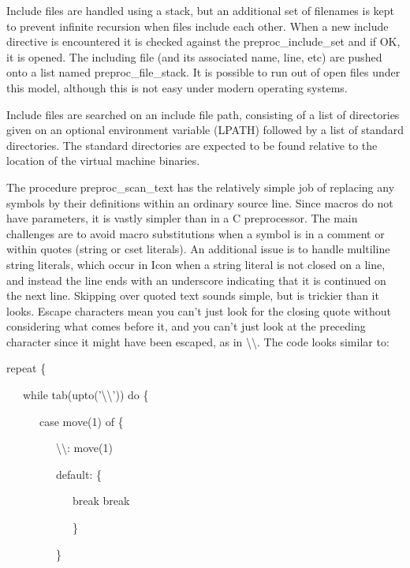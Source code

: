 Include files are handled using a stack, but an additional set of
filenames is kept to prevent infinite recursion when files include
each other. When a new include directive is encountered it is checked
against the preproc\_include\_set and if OK, it is opened. The
including file (and its associated name, line, etc) are pushed onto a
list named preproc\_file\_stack. It is possible to run out of open
files under this model, although this is not easy under modern
operating systems.

Include files are searched on an include file path, consisting of a
list of directories given on an optional environment variable (LPATH)
followed by a list of standard directories. The standard directories
are expected to be found relative to the location of the virtual
machine binaries.

The procedure preproc\_scan\_text has the relatively simple job of
replacing any symbols by their definitions within an ordinary source
line. Since macros do not have parameters, it is vastly simpler than
in a C preprocessor. The main challenges are to avoid macro
substitutions when a symbol is in a comment or within quotes (string
or cset literals).  An additional issue is to handle multiline string
literals, which occur in Icon when a string literal is not closed on a
line, and instead the line ends with an underscore indicating that it
is continued on the next line. Skipping over quoted text sounds
simple, but is trickier than it looks. Escape characters mean you
can't just look for the closing quote without considering what comes
before it, and you can't just look at the preceding character since it
might have been escaped, as in
{\textquotedbl}{\textbackslash}{\textbackslash}{\textquotedbl}. The
code looks similar to:

{\ttfamily\mdseries
repeat \{}

{\ttfamily\mdseries
\ \ \ while tab(upto('{\textquotedbl}{\textbackslash}{\textbackslash}')) do \{}

{\ttfamily\mdseries
\ \ \ \ \ \ case move(1) of \{}

{\ttfamily\mdseries
\ \ \ \ \ \ \ \ \ {\textquotedbl}{\textbackslash}{\textbackslash}{\textquotedbl}: move(1)}

{\ttfamily\mdseries
\ \ \ \ \ \ \ \ \ default: \{}

{\ttfamily\mdseries
\ \ \ \ \ \ \ \ \ \ \ \ break break}

{\ttfamily\mdseries
\ \ \ \ \ \ \ \ \ \ \ \ \}}

{\ttfamily\mdseries
\ \ \ \ \ \ \ \ \ \}}

